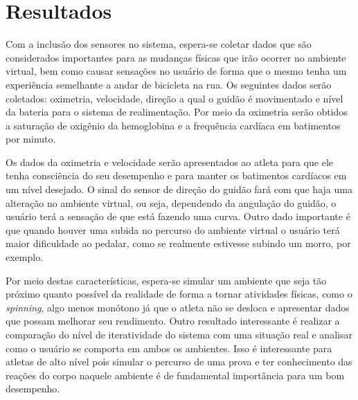 \chapter[Resultados]{Resultados}

Com a inclusão dos sensores no sistema, espera-se coletar dados que são considerados importantes para as mudanças físicas que irão ocorrer no ambiente virtual, bem como causar sensações no usuário de forma que o mesmo tenha um experiência semelhante a andar de bicicleta na rua. Os seguintes dados serão coletados: oximetria, velocidade, direção a qual o guidão é movimentado e nível da bateria para o sistema de realimentação. Por meio da oximetria serão obtidos a saturação de oxigênio da hemoglobina e a frequência cardíaca em batimentos por minuto.

Os dados da oximetria e velocidade serão apresentados ao atleta para que ele tenha consciência do seu desempenho e para manter os batimentos cardíacos em um nível desejado. O sinal do sensor de direção do guidão fará com que haja uma alteração no ambiente virtual, ou seja, dependendo da angulação do guidão, o usuário terá a sensação de que está fazendo uma curva. Outro dado importante é que quando houver uma subida no percurso do ambiente virtual o usuário terá maior dificuldade ao pedalar, como se realmente estivesse subindo um morro, por exemplo.

Por meio destas características, espera-se simular um ambiente que seja tão próximo quanto possível da realidade de forma a tornar atividades físicas, como o \textit{spinning}, algo menos monótono já que o atleta não se desloca e apresentar dados que possam melhorar seu rendimento. Outro resultado interessante é realizar a comparação do nível de iteratividade do sistema com uma situação real e analisar como o usuário se comporta em ambos os ambientes. Isso é interessante para atletas de alto nível pois simular o percurso de uma prova e ter conhecimento das reações do corpo naquele ambiente é de fundamental importância para um bom desempenho.

